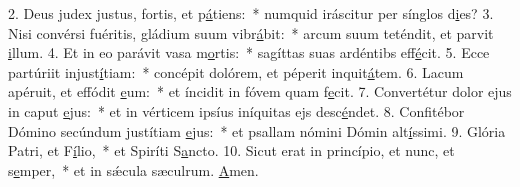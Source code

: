 2. Deus judex justus, fortis, et p\uline{á}tiens:~* numquid iráscitur per sínglos d\uline{i}es?
3. Nisi convérsi fuéritis, gládium suum vibr\uline{á}bit:~* arcum suum teténdit, et parvit \uline{i}llum.
4. Et in eo parávit vasa m\uline{o}rtis:~* sagíttas suas ardéntibs eff\uline{é}cit.
5. Ecce partúriit injust\uline{í}tiam:~* concépit dolórem, et péperit inquit\uline{á}tem.
6. Lacum apéruit, et effódit \uline{e}um:~* et íncidit in fóvem quam f\uline{e}cit.
7. Convertétur dolor ejus in caput \uline{e}jus:~* et in vérticem ipsíus iníquitas ejs desc\uline{é}ndet.
8. Confitébor Dómino secúndum justítiam \uline{e}jus:~* et psallam nómini Dómin alt\uline{í}ssimi.
9. Glória Patri, et F\uline{í}lio,~* et Spiríti S\uline{a}ncto.
10. Sicut erat in princípio, et nunc, et s\uline{e}mper,~* et in sǽcula sæculrum. \uline{A}men.
